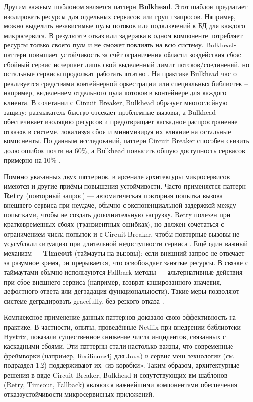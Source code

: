 Другим важным шаблоном является паттерн \textbf{Bulkhead}. Этот шаблон предлагает изолировать ресурсы для отдельных сервисов или групп запросов. Например, можно выделить независимые пулы потоков или подключений к БД для каждого микросервиса. В результате отказ или задержка в одном компоненте потребляет ресурсы только своего пула и не сможет повлиять на всю систему. Bulkhead-паттерн повышает устойчивость за счёт ограничения области воздействия сбоя: сбойный сервис исчерпает лишь свой выделенный лимит потоков/соединений, но остальные сервисы продолжат работать штатно \cite{IEEE2023}. На практике Bulkhead часто реализуется средствами контейнерной оркестрации или специальных библиотек – например, выделением отдельного пула потоков в контейнере для каждого клиента. В сочетании с Circuit Breaker, Bulkhead образует многослойную защиту: размыкатель быстро отсекает проблемные вызовы, а Bulkhead обеспечивает изоляцию ресурсов и предотвращает каскадное распространение отказов в системе, локализуя сбои и минимизируя их влияние на остальные компоненты. По данным исследований, паттерн Circuit Breaker способен снизить долю ошибок почти на 60\%, а Bulkhead повысить общую доступность сервисов примерно на 10\% \cite{IEEE2023}.

Помимо указанных двух паттернов, в арсенале архитектуры микросервисов имеются и другие приёмы повышения устойчивости. Часто применяется паттерн \textbf{Retry} (повторный запрос) --- автоматическая повторная попытка вызова внешнего сервиса при неудаче, обычно с экспоненциальной задержкой между попытками, чтобы не создать дополнительную нагрузку. Retry полезен при кратковременных сбоях (транзиентных ошибках), но должен сочетаться с ограничением числа попыток и с Circuit Breaker, чтобы повторные вызовы не усугубляли ситуацию при длительной недоступности сервиса \cite{Punithavathy2024}. Ещё один важный механизм --- \textbf{Timeout} (таймауты на вызовы): если внешний запрос не отвечает за разумное время, он прерывается, что освобождает занятые ресурсы. В связке с таймаутами обычно используются Fallback-методы --- альтернативные действия при сбое внешнего сервиса (например, возврат кэшированного значения, дефолтного ответа или деградация функциональности). Такие меры позволяют системе деградировать gracefully, без резкого отказа \cite{Nygard2018}.

Комплексное применение данных паттернов доказало свою эффективность на практике. В частности, опыты, проведённые Netflix при внедрении библиотеки Hystrix, показали существенное снижение числа инцидентов, связанных с каскадными сбоями. Эти паттерны стали настолько важны, что современные фреймворки (например, Resilience4j для Java) и сервис-меш технологии (см. подраздел 1.2) поддерживают их «из коробки». Таким образом, архитектурные решения в виде Circuit Breaker, Bulkhead и сопутствующих им шаблонов (Retry, Timeout, Fallback) являются важнейшими компонентами обеспечения отказоустойчивости микросервисных приложений.

